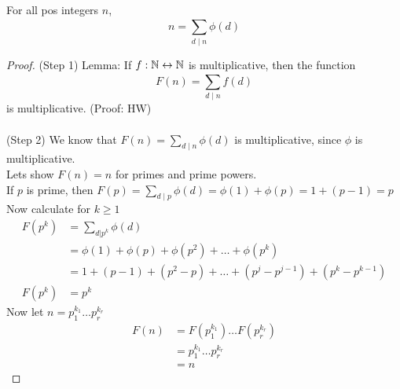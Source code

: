     \begin{theorem}
        For all pos  integers $n$,
        \[ n = \sum_{d\mid n}^{}\phi(d) \]
        \begin{proof}
            (Step 1) Lemma: If $f: \mathbb{N}\leftrightarrow\mathbb{N}$ is multiplicative, 
            then the function 
            \[ F(n) = \sum_{d\mid n}^{}f(d) \]
            is multiplicative. (Proof: HW) \\\\
            (Step 2) We know that $F(n) = \sum_{d\mid n}^{}\phi(d)$
            is multiplicative, since $\phi$ is multiplicative. \\
            Lets show $F(n)=n$ for primes and prime powers. \\
            If $p$ is prime, then $F(p) = \sum_{d\mid p}^{}\phi(d)
            = \phi(1) + \phi(p) = 1 + (p-1) = p$ \\
            Now calculate for $k\ge 1$
            \begin{align*}
                F(p^k) &= \sum_{d|p^k}^{}\phi(d) \\
                &= \phi(1) + \phi(p) + \phi(p^2) + \dots + \phi(p^k) \\
                &= 1 + (p-1) + (p^2-p) + \dots + (p^j-p^{j-1})+(p^k-p^{k-1}) \\
                F(p^k) &= p^k
            \end{align*}
            Now let $n=p_1^{k_1}\dots p_r^{k_r}$
            \begin{align*}
                F(n) &= F(p_1^{k_1})\dots F(p_r^{k_r}) \\
                &= p_1^{k_1}\dots p_r^{k_r} \\
                &= n
            \end{align*}
        \end{proof}
    \end{theorem}

